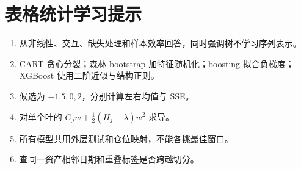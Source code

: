 \chapter{表格统计学习提示}
\begin{enumerate}[leftmargin=*]
  \item 从非线性、交互、缺失处理和样本效率回答，同时强调树不学习序列表示。
  \item CART 贪心分裂；森林 bootstrap 加特征随机化；boosting 拟合负梯度；XGBoost 使用二阶近似与结构正则。
  \item 候选为 $-1.5,0,2$，分别计算左右均值与 SSE。
  \item 对单个叶的 $G_jw+\frac12(H_j+\lambda)w^2$ 求导。
  \item 所有模型共用外层测试和仓位映射，不能各挑最佳窗口。
  \item 查同一资产相邻日期和重叠标签是否跨越切分。
\end{enumerate}
